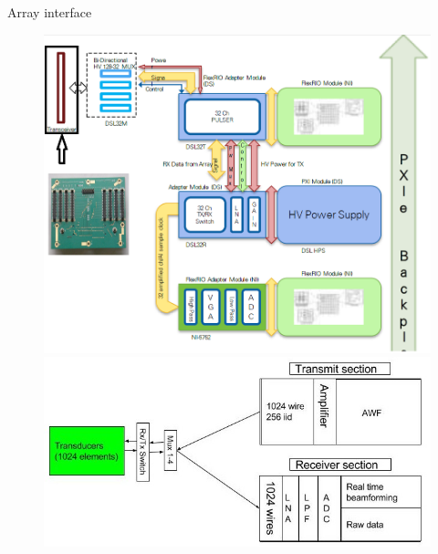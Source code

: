 \documentclass[t,12pt,english
\ifx\beamermode\undefined\else,\beamermode\fi
]{beamer}
\begin{document}
\begin{frame}{Array interface}

\begin{figure}[!htb]
\includegraphics[width=.95\textwidth]{2_5.png}
\endminipage
{}
\includegraphics[width=1\textwidth,left]{41.jpg}
\endminipage
\end{figure}

\end{frame}
\end{document}
